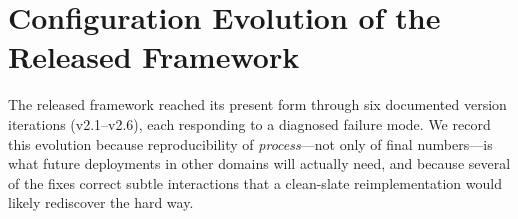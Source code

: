 \section{Configuration Evolution of the Released Framework}
\label{sec:appendix}

The released framework reached its present form through six documented
version iterations (v2.1--v2.6), each responding to a diagnosed
failure mode. We record this evolution because reproducibility of
\emph{process}---not only of final numbers---is what future
deployments in other domains will actually need, and because several
of the fixes correct subtle interactions that a clean-slate
reimplementation would likely rediscover the hard way.

